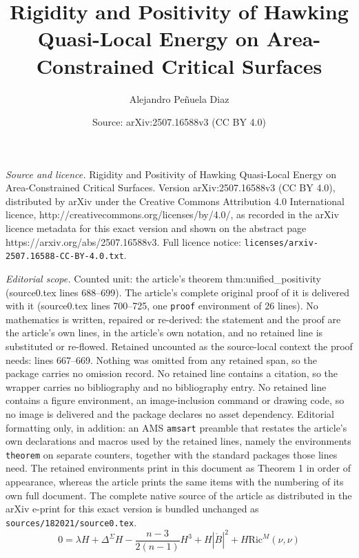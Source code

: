 \documentclass[10pt,a4paper]{amsart}
\title{Rigidity and Positivity of Hawking Quasi-Local Energy on Area-Constrained Critical Surfaces}
\author{Alejandro Pe\~nuela Diaz}
\date{Source: arXiv:2507.16588v3 (CC BY 4.0)}
\begin{document}
\maketitle

\noindent\emph{Source and licence.} Rigidity and Positivity of Hawking Quasi-Local Energy on Area-Constrained Critical Surfaces. Version arXiv:2507.16588v3 (CC BY 4.0), distributed by arXiv under the Creative Commons Attribution 4.0 International licence, http://creativecommons.org/licenses/by/4.0/, as recorded in the arXiv licence metadata for this exact version and shown on the abstract page https://arxiv.org/abs/2507.16588v3. Full licence notice: \texttt{licenses/arxiv-2507.16588-CC-BY-4.0.txt}.\par\smallskip

\noindent\textit{Editorial scope.} Counted unit: the article's theorem thm:unified\_positivity (source0.tex lines 688--699). The article's complete original proof of it is delivered with it (source0.tex lines 700--725, one \texttt{proof} environment of 26 lines). No mathematics is written, repaired or re-derived: the statement and the proof are the article's own lines, in the article's own notation, and no retained line is substituted or re-flowed.  Retained uncounted as the source-local context the proof needs: lines 667--669.  Nothing was omitted from any retained span, so the package carries no omission record.  No retained line contains a citation, so the wrapper carries no bibliography and no bibliography entry.  No retained line contains a figure environment, an image-inclusion command or drawing code, so no image is delivered and the package declares no asset dependency.  Editorial formatting only, in addition: an AMS \texttt{amsart} preamble that restates the article's own declarations and macros used by the retained lines, namely the environments \texttt{theorem} on separate counters, together with the standard packages those lines need.  The retained environments print in this document as Theorem 1 in order of appearance, whereas the article prints the same items with the numbering of its own full document.  The complete native source of the article as distributed in the arXiv e-print for this exact version is bundled unchanged as \texttt{sources/182021/source0.tex}.
\begin{equation}\label{willmorehigherdim}
    0= \lambda H  +\Delta^\Sigma H- \frac{n-3}{2(n-1)}H^3 + H|\mathring{B}|^2+ H \mathrm{Ric}^M(\nu, \nu) 
\end{equation}
\end{document}
